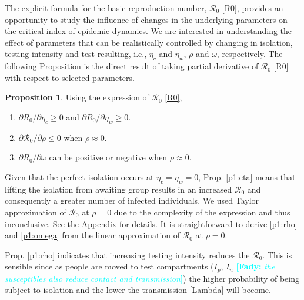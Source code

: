 \documentclass[12pt]{article}
\newcommand{\comment}{\showcomment}
\newcommand{\showcomment}[3]{\textcolor{#1}{\textbf{[#2: }\textsl{#3}\textbf{]}}}
\newcommand{\fady}[1]{\comment{cyan}{Fady}{#1}}
\newcommand{\Rnum}{\mathcal{R}_0}
\theoremstyle{definition} %
\newtheorem{proposition}{Proposition}
\begin{document}
The explicit formula for the basic reproduction number, $\Rnum$ \eqref{R0}, provides an opportunity to study the influence of changes in the underlying parameters on the critical index of epidemic dynamics. We are interested in understanding the effect of parameters that can be realistically controlled by changing in isolation, testing intensity and test resulting, i.e., $\eta_c$ and $\eta_w$, $\rho$ and $\omega$, respectively. The following Proposition is the direct result of taking partial derivative of $\Rnum$ \eqref{R0} with respect to selected parameters. 

\begin{proposition}
\label{prop1}
Using the expression of $\Rnum$ \eqref{R0},
\begin{enumerate}
\item \label{p1:eta}
$\partial{R_0}/\partial{\eta_c} \geq 0$ and $\partial{R_0}/\partial{\eta_w} \geq 0$. 
\item \label{p1:rho}
$\partial{\Rnum}/\partial{\rho} \leq 0$ when $\rho \approx 0$.
\item \label{p1:omega}
$\partial{R_0}/\partial{\omega}$ can be positive or negative when $\rho \approx 0$.
\end{enumerate}
\end{proposition}

 Given that the perfect isolation occurs at $\eta_c=\eta_w = 0$, Prop. \ref{p1:eta} means that lifting the isolation from awaiting group results in an increased $\Rnum$ and consequently a greater number of infected individuals. We used Taylor approximation of $\Rnum$ at $\rho=0$ due to the complexity of the expression and thus inconclusive. See the Appendix for details. It is straightforward to derive \ref{p1:rho} and \ref{p1:omega} from the linear approximation of $\Rnum$ at $\rho=0$.
 
 Prop. \ref{p1:rho} indicates that increasing testing intensity reduces the $\Rnum$. This is sensible since as people are moved to test compartments ($I_p$, $I_n$ \fady{the susceptibles also reduce contact and transmission}) the higher probability of being subject to isolation and the lower the transmission \eqref{Lambda} will become.
 
\end{document}
